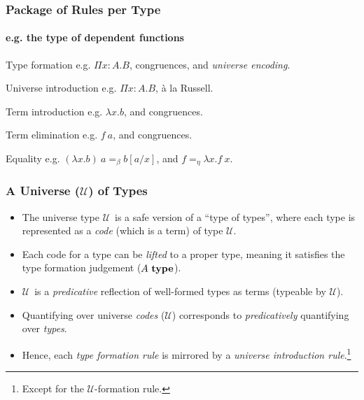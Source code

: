\documentclass[mathserif]{beamer}
\newcommand{\istype}[1]{\ensuremath{#1 ~\textbf{\textrm{type}}}}
\newcommand{\Funv}[3]{\ensuremath{\Pi #1{:}#2. #3}}
\newcommand{\Fun}[2]{\Funv{x}{#1}{#2}}
\newcommand{\funv}[2]{\ensuremath{\lambda #1. #2}}
\newcommand{\fun}[1]{\funv{x}{#1}}
\newcommand{\app}[2]{\ensuremath{#1~#2}}
\newcommand{\sub}[2]{\ensuremath{#1[#2/x]}}
\newcommand{\Type}[0]{\ensuremath{\mathcal{U}}}
\begin{document}
\begin{frame}
\frametitle{Package of Rules per Type}
\framesubtitle{e.g. the type of dependent functions}

\begin{block}{Type formation}
e.g. \Fun{A}{B}, congruences, and \textit{universe encoding}.
\end{block}

\begin{block}{Universe introduction}
e.g. \Fun{A}{B}, {\`a} la Russell.
\end{block}

\begin{block}{Term introduction}
e.g. \fun{b}, and congruences.
\end{block}

\begin{block}{Term elimination}
e.g. \app{f}{a}, and congruences.
\end{block}

\begin{block}{Equality}
  e.g. $\app{(\fun{b})}{a} =_\beta \sub{b}{a}$, and
  $f =_\eta \fun{\app{f}{x}}$.
\end{block}

\end{frame}

\begin{frame}
\frametitle{A Universe (\Type) of Types}

\begin{itemize}

\item
The universe type \Type ~is a safe version of a ``type of types'',
where each type is represented as a \textit{code}
(which is a term) of type \Type.

\item
Each code for a type can be \textit{lifted} to a proper type,
meaning it satisfies the type formation judgement (\istype{A}).

\item
\Type ~is a \textit{predicative} reflection of well-formed types
as terms (typeable by \Type).

\item
Quantifying over universe \textit{codes} (\Type) corresponds to
\textit{predicatively} quantifying over \textit{types}. 

\item
Hence, each \textit{type formation rule} is mirrored
by a \textit{universe introduction rule}.\footnote{
  Except for the \Type-formation rule.
  }

\end{itemize}

\end{frame}
\end{document}
